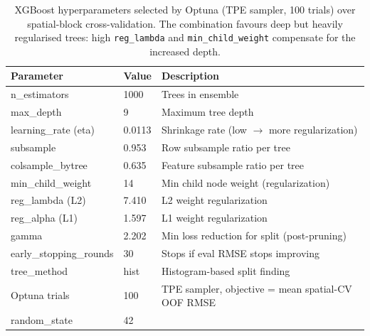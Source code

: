 \begin{table}[t]
\centering
\caption{XGBoost hyperparameters selected by Optuna (TPE sampler, 100 trials) over spatial-block cross-validation. The combination favours deep but heavily regularised trees: high \texttt{reg\_lambda} and \texttt{min\_child\_weight} compensate for the increased depth.}
\label{tab:hyperparams}
\footnotesize
\begin{tabular}{lll}
\toprule
\textbf{Parameter} & \textbf{Value} & \textbf{Description} \\
\midrule
n\_estimators & 1000 & Trees in ensemble \\
max\_depth & 9 & Maximum tree depth \\
learning\_rate (eta) & 0.0113 & Shrinkage rate (low $\to$ more regularization) \\
subsample & 0.953 & Row subsample ratio per tree \\
colsample\_bytree & 0.635 & Feature subsample ratio per tree \\
min\_child\_weight & 14 & Min child node weight (regularization) \\
reg\_lambda (L2) & 7.410 & L2 weight regularization \\
reg\_alpha (L1) & 1.597 & L1 weight regularization \\
gamma & 2.202 & Min loss reduction for split (post-pruning) \\
early\_stopping\_rounds & 30 & Stops if eval RMSE stops improving \\
tree\_method & hist & Histogram-based split finding \\
Optuna trials & 100 & TPE sampler, objective = mean spatial-CV OOF RMSE \\
random\_state & 42 &  \\
\bottomrule
\end{tabular}
\end{table}
